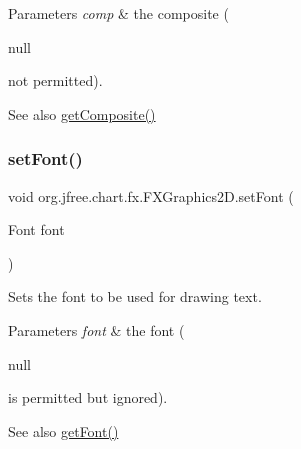 \begin{DoxyParams}{Parameters}
{\em comp} & the composite (
\begin{DoxyCode}
null 
\end{DoxyCode}
 not permitted).\\
\hline
\end{DoxyParams}
\begin{DoxySeeAlso}{See also}
\mbox{\hyperlink{classorg_1_1jfree_1_1chart_1_1fx_1_1_f_x_graphics2_d_ad464b911fede89539635352d2f89e4d7}{get\+Composite()}} 
\end{DoxySeeAlso}
\mbox{\label{classorg_1_1jfree_1_1chart_1_1fx_1_1_f_x_graphics2_d_a20e1506df8646706b0b404e9a6b1423f}} 
\subsubsection{\texorpdfstring{set\+Font()}{setFont()}}
{\footnotesize\ttfamily void org.\+jfree.\+chart.\+fx.\+F\+X\+Graphics2\+D.\+set\+Font (\begin{DoxyParamCaption}\item[{Font}]{font }\end{DoxyParamCaption})}

Sets the font to be used for drawing text.


\begin{DoxyParams}{Parameters}
{\em font} & the font (
\begin{DoxyCode}
null 
\end{DoxyCode}
 is permitted but ignored).\\
\hline
\end{DoxyParams}
\begin{DoxySeeAlso}{See also}
\mbox{\hyperlink{classorg_1_1jfree_1_1chart_1_1fx_1_1_f_x_graphics2_d_ab188424f822b24ccc86d39740e4183e4}{get\+Font()}} 
\end{DoxySeeAlso}
\mbox{\label{classorg_1_1jfree_1_1chart_1_1fx_1_1_f_x_graphics2_d_adad6db25635ffeb6e5684c12d2ca03aa}} 

